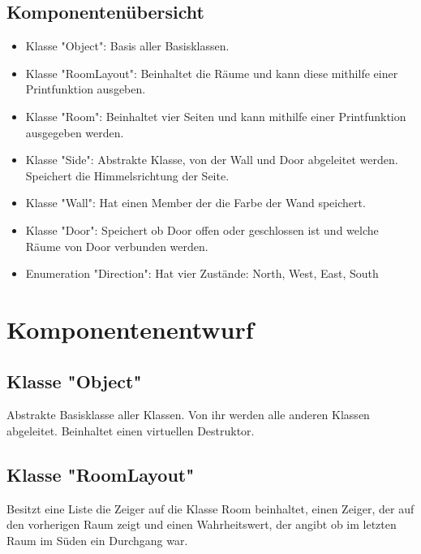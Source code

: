 \documentclass[12pt,a4paper]{article}
\begin{document}
\subsection {Komponentenübersicht}
\begin {itemize} 
	\item Klasse "Object":
	\newline
	Basis aller Basisklassen.
	\item Klasse "RoomLayout":
	\newline
	Beinhaltet die Räume und kann diese mithilfe einer Printfunktion ausgeben.
	\item Klasse "Room":
	\newline	
	Beinhaltet vier Seiten und kann mithilfe einer Printfunktion ausgegeben werden.
	\item Klasse "Side":
	\newline
	Abstrakte Klasse, von der Wall und Door abgeleitet werden. Speichert die Himmelsrichtung der Seite.
	\item Klasse "Wall":
	\newline
	Hat einen Member der die Farbe der Wand speichert.
	\item Klasse "Door": 
	\newline
	Speichert ob Door offen oder geschlossen ist und welche Räume von Door verbunden werden.
	\item Enumeration "Direction":
	\newline
	Hat vier Zustände: North, West, East, South

\end {itemize}

\newpage
\section {Komponentenentwurf}
\subsection {Klasse "Object"}
Abstrakte Basisklasse aller Klassen. Von ihr werden alle anderen Klassen abgeleitet. Beinhaltet einen virtuellen Destruktor.

\subsection {Klasse "RoomLayout"}
Besitzt eine Liste die Zeiger auf die Klasse Room beinhaltet, einen Zeiger, der auf den vorherigen Raum zeigt und einen Wahrheitswert, der angibt ob im letzten Raum im Süden ein Durchgang war. \\
\end{document}
